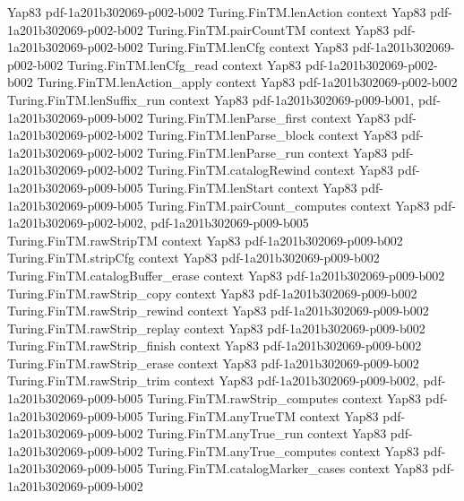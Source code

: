 \begin{theorem}
  {Yap83}
  {pdf-1a201b302069-p002-b002}
\proofstep
  {Turing.FinTM.lenAction}
  {context}
  {Yap83}
  {pdf-1a201b302069-p002-b002}
\proofstep
  {Turing.FinTM.pairCountTM}
  {context}
  {Yap83}
  {pdf-1a201b302069-p002-b002}
\proofstep
  {Turing.FinTM.lenCfg}
  {context}
  {Yap83}
  {pdf-1a201b302069-p002-b002}
\proofstep
  {Turing.FinTM.lenCfg_read}
  {context}
  {Yap83}
  {pdf-1a201b302069-p002-b002}
\proofstep
  {Turing.FinTM.lenAction_apply}
  {context}
  {Yap83}
  {pdf-1a201b302069-p002-b002}
\proofstep
  {Turing.FinTM.lenSuffix_run}
  {context}
  {Yap83}
  {pdf-1a201b302069-p009-b001,
    pdf-1a201b302069-p009-b002}
\proofstep
  {Turing.FinTM.lenParse_first}
  {context}
  {Yap83}
  {pdf-1a201b302069-p002-b002}
\proofstep
  {Turing.FinTM.lenParse_block}
  {context}
  {Yap83}
  {pdf-1a201b302069-p002-b002}
\proofstep
  {Turing.FinTM.lenParse_run}
  {context}
  {Yap83}
  {pdf-1a201b302069-p002-b002}
\proofstep
  {Turing.FinTM.catalogRewind}
  {context}
  {Yap83}
  {pdf-1a201b302069-p009-b005}
\proofstep
  {Turing.FinTM.lenStart}
  {context}
  {Yap83}
  {pdf-1a201b302069-p009-b005}
\proofstep
  {Turing.FinTM.pairCount_computes}
  {context}
  {Yap83}
  {pdf-1a201b302069-p002-b002,
    pdf-1a201b302069-p009-b005}
\proofstep
  {Turing.FinTM.rawStripTM}
  {context}
  {Yap83}
  {pdf-1a201b302069-p009-b002}
\proofstep
  {Turing.FinTM.stripCfg}
  {context}
  {Yap83}
  {pdf-1a201b302069-p009-b002}
\proofstep
  {Turing.FinTM.catalogBuffer_erase}
  {context}
  {Yap83}
  {pdf-1a201b302069-p009-b002}
\proofstep
  {Turing.FinTM.rawStrip_copy}
  {context}
  {Yap83}
  {pdf-1a201b302069-p009-b002}
\proofstep
  {Turing.FinTM.rawStrip_rewind}
  {context}
  {Yap83}
  {pdf-1a201b302069-p009-b002}
\proofstep
  {Turing.FinTM.rawStrip_replay}
  {context}
  {Yap83}
  {pdf-1a201b302069-p009-b002}
\proofstep
  {Turing.FinTM.rawStrip_finish}
  {context}
  {Yap83}
  {pdf-1a201b302069-p009-b002}
\proofstep
  {Turing.FinTM.rawStrip_erase}
  {context}
  {Yap83}
  {pdf-1a201b302069-p009-b002}
\proofstep
  {Turing.FinTM.rawStrip_trim}
  {context}
  {Yap83}
  {pdf-1a201b302069-p009-b002,
    pdf-1a201b302069-p009-b005}
\proofstep
  {Turing.FinTM.rawStrip_computes}
  {context}
  {Yap83}
  {pdf-1a201b302069-p009-b005}
\proofstep
  {Turing.FinTM.anyTrueTM}
  {context}
  {Yap83}
  {pdf-1a201b302069-p009-b002}
\proofstep
  {Turing.FinTM.anyTrue_run}
  {context}
  {Yap83}
  {pdf-1a201b302069-p009-b002}
\proofstep
  {Turing.FinTM.anyTrue_computes}
  {context}
  {Yap83}
  {pdf-1a201b302069-p009-b005}
\proofstep
  {Turing.FinTM.catalogMarker_cases}
  {context}
  {Yap83}
  {pdf-1a201b302069-p009-b002}

\end{theorem}
